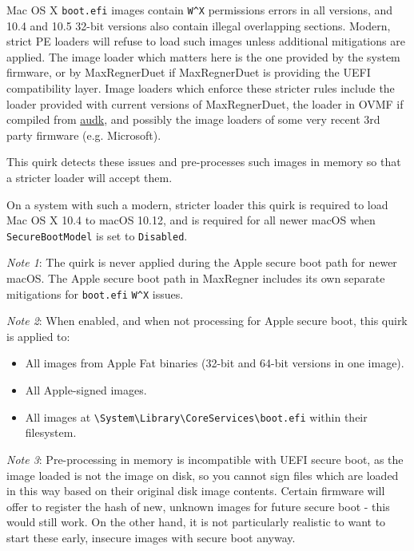 \documentclass[]{article}
\providecommand{\tightlist}{%
  \setlength{\itemsep}{0pt}\setlength{\parskip}{0pt}}
\begin{document}
\begin{enumerate}
  Mac OS X \texttt{boot.efi} images contain \texttt{W\^{}X} permissions errors
  in all versions, and 10.4 and 10.5 32-bit versions also contain illegal overlapping
  sections. Modern, strict PE loaders will refuse to load such images unless additional
  mitigations are applied. The image loader which matters here is the one provided by
  the system firmware, or by MaxRegnerDuet if MaxRegnerDuet is providing
  the UEFI compatibility layer. Image loaders which enforce these stricter
  rules include the loader provided with current versions of MaxRegnerDuet,
  the loader in OVMF if compiled from \href{https://github.com/acidanthera/audk}{audk},
  and possibly the image loaders of some very recent 3rd party firmware (e.g. Microsoft).

  This quirk detects these issues and pre-processes such images in memory
  so that a stricter loader will accept them.

  On a system with such a modern, stricter loader this quirk is required to load
  Mac OS X 10.4 to macOS 10.12, and is required for all newer
  macOS when \texttt{SecureBootModel} is set to \texttt{Disabled}.

  \emph{Note 1}: The quirk is never applied during the Apple secure boot path for
  newer macOS. The Apple secure boot path in MaxRegner includes its own separate
  mitigations for \texttt{boot.efi} \texttt{W\^{}X} issues.

  \emph{Note 2}: When enabled, and when not processing for Apple secure boot, this quirk
  is applied to:
    \begin{itemize}
      \tightlist
      \item All images from Apple Fat binaries (32-bit and 64-bit versions in one image).
      \item All Apple-signed images.
      \item All images at
      \texttt{\textbackslash System\textbackslash Library\textbackslash CoreServices\textbackslash boot.efi}
      within their filesystem.
    \end{itemize}

  \emph{Note 3}: Pre-processing in memory is incompatible with UEFI secure boot, as the image
  loaded is not the image on disk, so you cannot sign files which are loaded in this way
  based on their original disk image contents.
  Certain firmware will offer to register the hash of new, unknown images for future
  secure boot - this would still work. On the other hand, it is not particularly realistic
  to want to start these early, insecure images with secure boot anyway.


\end{enumerate}
\end{document}
